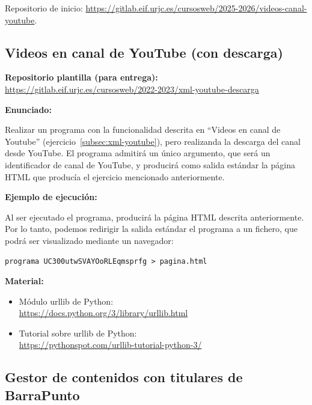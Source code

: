 Repositorio de inicio: \url{https://gitlab.eif.urjc.es/cursosweb/2025-2026/videos-canal-youtube}.

\subsection{Videos en canal de YouTube (con descarga)}
\label{subsec:xml-youtube-descarga}

\textbf{Repositorio plantilla (para entrega):} \\
\url{https://gitlab.eif.urjc.es/cursosweb/2022-2023/xml-youtube-descarga}

\textbf{Enunciado:}

Realizar un programa con la funcionalidad descrita en ``Videos en canal de Youtube'' (ejercicio~\ref{subsec:xml-youtube}), pero realizanda la descarga del canal desde YouTube. El programa admitirá un único argumento, que será un identificador de canal de YouTube, y producirá como salida estándar la página HTML que producía el ejercicio mencionado anteriormente.

\textbf{Ejemplo de ejecución:}

Al ser ejecutado el programa, producirá la página HTML descrita anteriormente. Por lo tanto, podemos redirigir la salida estándar el programa a un fichero, que podrá ser visualizado mediante un navegador:

\begin{verbatim}
programa UC300utwSVAYOoRLEqmsprfg > pagina.html
\end{verbatim}

\textbf{Material:}

\begin{itemize}
\item Módulo urllib de Python: \\
  \url{https://docs.python.org/3/library/urllib.html}
\item Tutorial sobre urllib de Python: \\
  \url{https://pythonspot.com/urllib-tutorial-python-3/}
\end{itemize}

\subsection{Gestor de contenidos con titulares de BarraPunto}
\label{subsec:contentapp-barrapunto}

